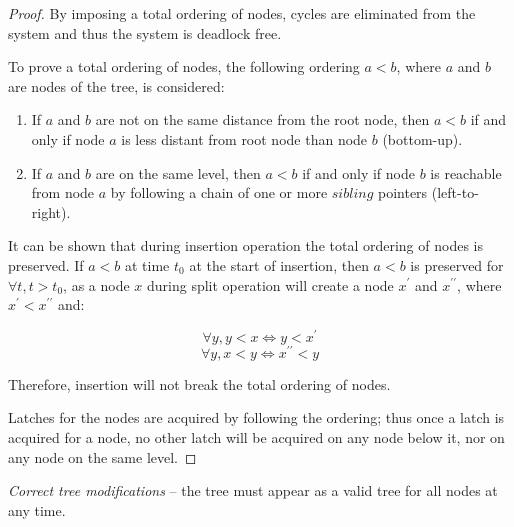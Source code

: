\begin{proof}
  By imposing a total ordering of nodes, cycles are eliminated from the system and thus the system is deadlock free.

  To prove a total ordering of nodes, the following ordering $a < b$, where $a$ and $b$ are nodes of the tree, is considered:

  \begin{enumerate}
    \item If $a$ and $b$ are not on the same distance from the root node, then $a < b$ if and only if node $a$ is less distant from root node than node $b$ (bottom-up).
    \item If $a$ and $b$ are on the same level, then $a < b$ if and only if node $b$ is reachable from node $a$ by following a chain of one or more $sibling$ pointers (left-to-right).
  \end{enumerate}

  It can be shown that during insertion operation the total ordering of nodes is preserved. If $a < b$ at time $t_0$ at the start of insertion, then $a < b$ is preserved for $\forall t, t > t_0$, as a node $x$ during split operation will create a node $x^\prime$ and $x^{\prime\prime}$, where $x^\prime < x^{\prime\prime}$ and:

  $$\forall y, y < x \Leftrightarrow y < x^\prime$$
  $$\forall y, x < y \Leftrightarrow x^{\prime\prime} < y$$

  Therefore, insertion will not break the total ordering of nodes.

  Latches for the nodes are acquired by following the ordering; thus once a latch is acquired for a node, no other latch will be acquired on any node below it, nor on any node on the same level.
\end{proof}

\begin{theorem}\label{theorem:b-link-tree:modifications}
  \textit{Correct tree modifications} -- the tree must appear as a valid tree for all nodes at any time.
\end{theorem}


